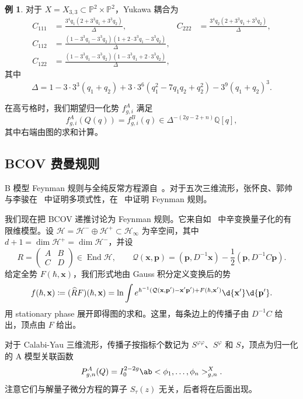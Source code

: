 \documentclass{amsart}
\theoremstyle{definition}
\newtheorem{exm}[thm]{例}
\theoremstyle{remark}
\theoremstyle{plain}
\theoremstyle{definition}
\theoremstyle{remark}
\newcommand{\Q}{\mathbb{Q}}
\renewcommand{\P}{\mathbb{P}}
\newcommand{\mc}[1]{\mathcal{#1}}
\newcommand{\mbf}[1]{\mathbf{#1}}
\newcommand{\bp}{\mbf{p}}
\newcommand{\wh}[1]{\widehat{#1}}
\newcommand{\1}{\mathbf{1}}
\newcommand{\2}{\mathbf{2}}
\newcommand{\3}{\mathbf{3}}
\DeclareMathOperator{\End}{End}
\begin{document}
\begin{exm}
    对于 \(X = X_{3,3} \subset \P^2 \times \P^2\)，Yukawa 耦合为
    \begin{align*}
        C_{111} &= \frac{3^4 q_1 (2+3^3q_1+3^3q_2)}{\Delta}, & C_{222} &= \frac{3^4 q_2(2+3^3q_1+3^3q_2)}{\Delta}, \\
        C_{112} &= \frac{(1-3^3q_1-3^3q_2)(1+2\cdot 3^3 q_1 - 3^3 q_2)}{\Delta}, \\
        C_{122} &= \frac{(1-3^3q_1-3^3q_2)(1-3^3q_1+2\cdot3^3q_2)}{\Delta},
    \end{align*}
    其中
    \[ \Delta = 1 - 3\cdot3^3(q_1+q_2) + 3\cdot3^6(q_1^2 - 7q_1q_2+q_2^2) - 3^9(q_1+q_2)^3. \]
\end{exm}

在高亏格时，我们期望归一化势 \(f^A_{g,i}\) 满足
\[ f^A_{g,i}(Q(q)) = f^B_{g,i}(q) \in \Delta^{-(2g-2+n)}\Q[q], \]
其中右端由图的求和计算。

\subsection{BCOV 费曼规则}%
\label{sub:The BCOV Feynman rule}

B 模型 Feynman 规则与全纯反常方程源自~\cite{BCOV1994}。对于五次三维流形，张怀良、郭帅与李骏在~\cite{CGL2021} 中证明多项式性，在~\cite{CGL2026} 中证明 Feynman 规则。

我们现在把 BCOV 递推讨论为 Feynman 规则。它来自如~ 中辛变换量子化的有限维模型。设 \(\mc{H} = \mc{H}^- \oplus \mc{H}^+ \subset \mc{H}_{\infty}\) 为辛空间，其中 \(d+1 = \dim \mc{H}^+ = \dim \mc{H}^-\)，并设
\[ R = \begin{pmatrix} A & B \\ C & D \end{pmatrix} \in \End \mc{H}, \qquad \mc{Q}(\mbf{x},\bp) = (\bp, D^{-1}\mbf{x}) - \frac{1}{2}(\bp, D^{-1}C\bp). \]
给定全势 \(F(\hbar, \mbf{x})\)，我们形式地由 Gauss 积分定义变换后的势
\[ f(\hbar, \mbf{x}) \coloneqq (\wh{R}F)(\hbar,\mbf{x}) = \ln \int e^{\hbar^{-1}(\mc{Q}(\mbf{x},\bp') - \mbf{x}'\bp') + F(\hbar,\mbf{x}')}\d{\mbf{x}'}\d{\bp'}. \]
用 stationary phase 展开即得图的求和。这里，每条边上的传播子由 \(D^{-1}C\) 给出，顶点由 \(F\) 给出。

对于 Calabi-Yau 三维流形，传播子按指标个数记为 \(S^{\varphi\varphi}\)、\(S^{\varphi}\) 和 \(S\)，顶点为归一化的 A 模型关联函数
\[ P^A_{g,n}(Q) = I_0^{2-2g}\ab<\phi_1, \ldots, \phi_n>^X_{g,n}. \]
注意它们与解量子微分方程的算子 \(S_{\tau}(z)\) 无关，后者将在后面出现。
\end{document}
